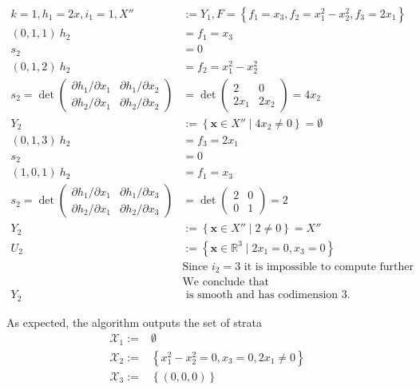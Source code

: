 \documentclass[
]{book}
\theoremstyle{definition}
\theoremstyle{definition}
\theoremstyle{definition}
\theoremstyle{definition}
\theoremstyle{remark}
\begin{document}
\begin{align}
k=1,h_{1}=2x,i_{1}=1,X''&:=Y_{1},F=\left\{ f_{1}=x_{3},f_{2}=x_{1}^{2}-x_{2}^{2},f_{3}=2x_{1}\right\} \\\left(0,1,1\right)\ h_{2}&=f_{1}=x_{3}\\s_{2}&=0\\\left(0,1,2\right)\ h_{2}&=f_{2}=x_{1}^{2}-x_{2}^{2}\\s_{2}=\det\begin{pmatrix}\partial h_{1}/\partial x_{1} & \partial h_{1}/\partial x_{2}\\
\partial h_{2}/\partial x_{1} & \partial h_{2}/\partial x_{2}
\end{pmatrix}&=\det\begin{pmatrix}2 & 0\\
2x_{1} & 2x_{2}
\end{pmatrix}=4x_{2}\\Y_{2}&:=\left\{ \mathbf{x}\in X''\mid4x_{2}\ne0\right\} =\emptyset\\\left(0,1,3\right)\ h_{2}&=f_{3}=2x_{1}\\s_{2}&=0\\\left(1,0,1\right)\ h_{2}&=f_{1}=x_{3}\\s_{2}=\det\begin{pmatrix}\partial h_{1}/\partial x_{1} & \partial h_{1}/\partial x_{3}\\
\partial h_{2}/\partial x_{1} & \partial h_{2}/\partial x_{3}
\end{pmatrix}&=\det\begin{pmatrix}2 & 0\\
0 & 1
\end{pmatrix}=2\\Y_{2}&:=\left\{ \mathbf{x}\in X''\mid2\ne0\right\} =X''\\U_{2}&:=\left\{ \mathbf{x}\in\mathbb{R}^{3}\mid2x_{1}=0,x_{3}=0\right\} \\&\text{Since }i_{2}=3\text{ it is impossible to compute further derivatives.}\\&\text{We conclude that}\\Y_{2}&\text{ is smooth and has codimension }3.
\end{align}

As expected, the algorithm outputs the set of strata
\begin{align*}
\mathcal{X}_{1}:=&\emptyset\\\mathcal{X}_{2}:=&\left\{ x_{1}^{2} - x_{2}^{2}=0,x_{3}=0,2x_{1}\ne0\right\} \\\mathcal{X}_{3}:=&\left\{ (0,0,0)\right\}
\end{align*}
\end{document}
